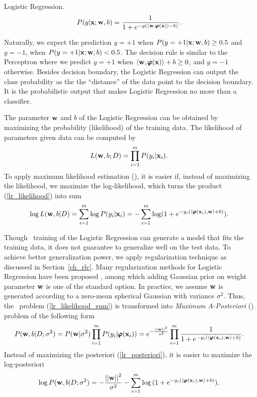 {\begin{definition}{Logistic Regression.}
	\begin{align*}
		P(y|\mathbf {x};\mathbf {w},b) = \frac{1}{1+e^{ -y(\langle \mathbf {w}, \pmb \varphi(\mathbf {x}) \rangle-b) }}.
	\end{align*}
\end{definition}
Naturally, we expect the prediction $y=+1$ when $P(y=+1|\mathbf {x};\mathbf {w},b)\ge0.5$ and $y=-1$, when $P(y=+1|\mathbf {x};\mathbf {w},b)<0.5$.
The decision rule is similar to the Perceptron where we predict $y=+1$ when $\langle \mathbf {w}, \pmb \varphi(\mathbf {x}) \rangle+b\ge0$, and $y=-1$ otherwise.
Besides decision boundary, the Logistic Regression can output the class probability as the the ``distance'' of the data point to the decision boundary.
It is the probabilistic output that makes Logistic Regression no more than a classifier.

The parameter $\mathbf {w}$ and $b$ of the Logistic Regression can be obtained by maximizing the probability (likelihood) of the training data.
The likelihood of parameters given data can be computed by
\begin{align}
	L(\mathbf {w},b;D) = \prod_{i=1}^mP(y_i|\mathbf {x}_i). \label{lr_likelihood}
\end{align}
To apply maximum likelihood estimation (\mle), it is easier if, instead of maximizing the likelihood, we maximize the log-likelihood, which turns the product (\ref{lr_likelihood}) into sum
\begin{align}
	\log L(\mathbf {w},b|D) = \sum_{i=1}^{m}\log P(y_i|\mathbf {x}_i) = -\sum_{i=1}^{m}\log (1+e^{ -y_i(\langle \pmb \varphi(\mathbf {x}_i), \mathbf {w} \rangle+b) }) \label{lr_likelihood_sum}.
\end{align}

Though \mle\ training of the Logistic Regression can generate a model that fits the training data, it does not guarantee to generalize well on the test data.
To achieve better generalization power, we apply regularization technique as discussed in Section~\ref{ch_rlc}.
Many regularization methods for Logistic Regression have been proposed \citep{Chen99,Chen00,Goodman03}, among which adding Gaussian prior on weight parameter $\mathbf {w}$ is one of the standard option.
In practice, we assume $\mathbf {w}$ is generated according to a zero-mean spherical Gaussian with variance $\sigma^2$.
Thus, the \mle\ problem (\ref{lr_likelihood_sum}) is transformed into \textit{Maximum A-Posteriori} (\map) problem of the following form
\begin{align}
	P(\mathbf {w},b|D;\sigma^2) = P(\mathbf {w}|\sigma^2)\prod_{i=1}^mP(y_i|\pmb \varphi(\mathbf {x}_i))=e^{ -\frac{\left|\left| \mathbf {w} \right|\right|^2}{\sigma^2} }\prod_{i=1}^{m}{\frac{1}{1+e^{ -y_i(\langle \pmb \varphi(\mathbf {x}_i), \mathbf {w} \rangle+b) }}}. \label{lr_posteriori}
\end{align}
Instead of maximizing the posteriori (\ref{lr_posteriori}), it is easier to maximize the log-posteriori
\begin{align}
	\log P(\mathbf {w},b|D;\sigma^2) = -{\frac{\left|\left| \mathbf {w} \right|\right|^2}{\sigma^2}} - \sum_{i=1}^{m}\log{(1+e^{ -y_i(\langle \pmb \varphi(\mathbf {x}_i), \mathbf {w}\rangle+b) })}. \label{lr_posteriori_log}
\end{align}

}
